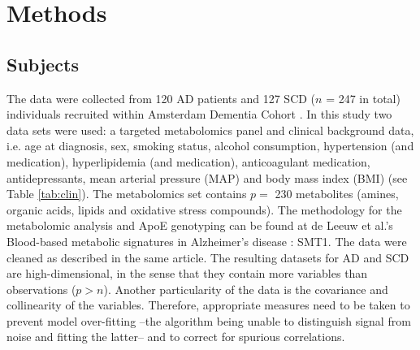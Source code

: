 \documentclass{amsart}
\begin{document}
\newpage
\section{Methods}\label{methods}

\subsection{Subjects}\label{subjects}
The data were collected from 120 AD patients and 127 SCD ($n$ = 247 in total) individuals recruited within Amsterdam Dementia Cohort \cite{VanDerFlier2018AmsterdamCare, deLeeuw2017Blood-basedDisease}. In this study two data sets were used: a targeted metabolomics panel and clinical background data, i.e. age at diagnosis, sex, smoking status, alcohol consumption, hypertension (and medication), hyperlipidemia (and medication), anticoagulant medication, antidepressants, mean arterial pressure (MAP) and body mass index (BMI) (see Table \ref{tab:clin}). The metabolomics set contains $p =$ 230 metabolites (amines, organic acids, lipids and oxidative stress compounds). The methodology for the metabolomic analysis and ApoE genotyping can be found at de Leeuw et al.'s  Blood-based metabolic signatures in Alzheimer's disease \cite{deLeeuw2017Blood-basedDisease}: SMT1. The data were cleaned as described in the same article. The resulting datasets for AD and SCD are high-dimensional, in the sense that they contain more variables than observations ($p > n$). Another particularity of the data is the covariance and collinearity of the variables. Therefore, appropriate measures need to be taken to prevent model over-fitting --the algorithm being unable to distinguish signal from noise and fitting the latter--  and to correct for spurious correlations.
\end{document}

